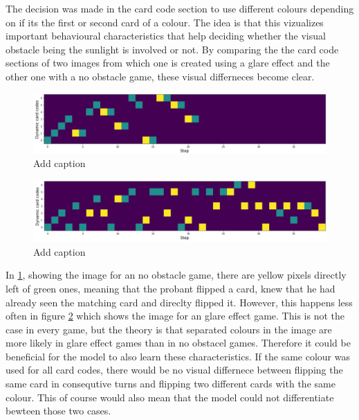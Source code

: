 The decision was made in the card code section to use different colours depending on if its the first or second card of a colour. The idea is that this vizualizes important behavioural characteristics that help deciding whether the visual obstacle being the sunlight is involved or not. By comparing the the card code sections of two images from which one is created using a glare effect and the other one with a no obstacle game, these visual differneces become clear. 
\begin{figure}[H]
	\centering
	\includegraphics[width=15cm]{images/cardCodesNoObst.png}
	\caption[Bild kurz]{Add caption}
	\label{fig:ccNo}
\end{figure}
\begin{figure}[H]
	\centering
	\includegraphics[width=15cm]{images/cardCodesGlare.png}
	\caption[Bild kurz]{Add caption}
	\label{fig:ccGlare}
\end{figure}

In \ref{fig:ccNo}, showing the image for an no obstacle game, there are yellow pixels directly left of green ones, meaning that the probant flipped a card, knew that he had already seen the matching card and direclty flipped it. However, this happens less often in figure \ref{fig:ccGlare} which shows the image for an glare effect game. This is not the case in every game, but the theory is that separated colours in the image are more likely in glare effect games than in no obstacel games. Therefore it could be beneficial for the model to also learn these characteristics. If the same colour was used for all card codes, there would be no visual differnece between flipping the same card in consequtive turns and flipping two different cards with the same colour. This of course would also mean that the model could not differentiate bewteen those two cases. 


